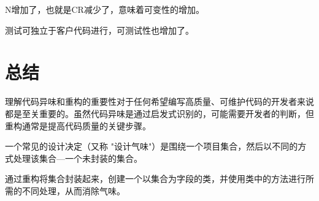 N增加了，也就是CR减少了，意味着可变性的增加。

测试可独立于客户代码进行，可测试性也增加了。

\section{总结}
理解代码异味和重构的重要性对于任何希望编写高质量、可维护代码的开发者来说都是至关重要的。虽然代码异味是通过启发式识别的，可能需要开发者的判断，但重构通常是提高代码质量的关键步骤。

一个常见的设计决定（又称 "设计气味"）是围绕一个项目集合，然后以不同的方式处理该集合---一个未封装的集合。

通过重构将集合封装起来，创建一个以集合为字段的类，并使用类中的方法进行所需的不同处理，从而消除气味。






























